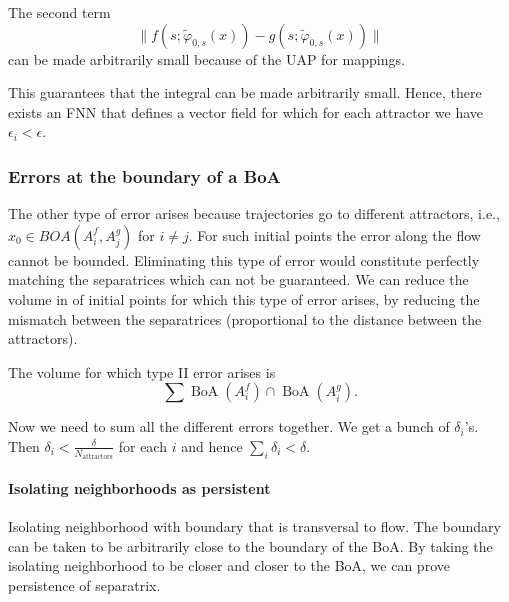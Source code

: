 \documentclass{article}
\theoremstyle{definition}
\theoremstyle{remark}
\newcommand{\cl}{\operatorname{cl}}
\newcommand{\boa}{\operatorname{BoA}}
\newcounter{ct}
\begin{document}
The second term
\[\|f(s; \tilde{\varphi}_{0,s}(x)) - g(s; \tilde{\varphi}_{0,s}(x))\|\]
can be made arbitrarily small because of the UAP for mappings.





This guarantees that the integral can be made arbitrarily small.	
Hence, there exists an FNN that defines a vector field for which for each attractor we have $\epsilon_i<\epsilon$. 






\subsubsection{Errors at the boundary of a BoA}%
\label{sec:separatrix_approx}
The other type of error arises because trajectories go to different attractors, i.e., $x_0\in BOA(A_i^f,A_j^g)$ for $i\neq j$.
For such initial points the error along the flow cannot be bounded.
Eliminating this type of error would constitute perfectly matching the separatrices which can not be guaranteed.
We can reduce the volume in of initial points for which this type of error arises, by reducing the mismatch between the separatrices (proportional to the distance between the attractors).

The volume for which type II error arises is 
\[\sum\boa(A_i^f)\cap\boa(A_i^g).\]






Now we need to sum all the different errors together.
We get a bunch of $\delta_i$'s.
Then $\delta_i< \frac{\delta}{N_{\operatorname{attractors}}}$ for each $i$ and hence $\sum_i\delta_i<\delta$.


\paragraph{Isolating neighborhoods as persistent}
Isolating neighborhood with boundary that is transversal to flow.
The boundary can be taken to be arbitrarily close to the boundary of the BoA.
By taking the isolating neighborhood to be closer and closer to the BoA, we can prove persistence of separatrix.
\end{document}
